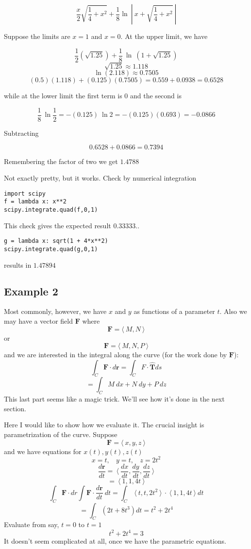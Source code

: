 \documentclass[11pt, oneside]{report}   	%
\begin{document}
\[ \frac{x}{2}\sqrt{\frac{1}{4} + x^2} + \frac{1}{8} \ln \ | \ x + \sqrt{\frac{1}{4} + x^2} \ | \]

Suppose the limits are $x=1$ and $x=0$.  At the upper limit, we have

\[ \frac{1}{2}(\sqrt{1.25}) + \frac{1}{8} \ \ln \ (1 + \sqrt{1.25}) \] 
\[ \sqrt{1.25} \approx 1.118  \]
\[ \ln (2.118) \approx 0.7505 \]
\[ (0.5)(1.118) + (0.125)(0.7505) = 0.559 + 0.0938 = 0.6528 \]

while at the lower limit the first term is $0$ and the second is

\[ \frac{1}{8}\  \ln \frac{1}{2} = - (0.125)\  \ln 2 = - (0.125)(0.693) = -0.0866 \] 

Subtracting

\[ 0.6528 + 0.0866 = 0.7394 \]

Remembering the factor of two we get $1.4788$

Not exactly pretty, but it works.  Check by numerical integration

\begin{verbatim}
import scipy
f = lambda x: x**2
scipy.integrate.quad(f,0,1)
\end{verbatim}
This check gives the expected result $ 0.33333..$

\begin{verbatim}
g = lambda x: sqrt(1 + 4*x**2)
scipy.integrate.quad(g,0,1)
\end{verbatim}
results in $1.47894$

\subsection*{Example 2}
Most commonly, however, we have $x$ and $y$ as functions of a parameter $t$.  Also we may have a vector field $\mathbf{F}$ where
\[ \mathbf{F} = \langle \ M,N \ \rangle \]
or
\[ \mathbf{F} = \langle \ M,N,P \ \rangle \]
and we are interested in the integral along the curve (for the work done by $\mathbf{F}$):
\[ \int_C \mathbf{F} \cdot d\mathbf{r} = \int_C F \cdot \hat{\mathbf{T}} ds \]
\[ = \int_C M \ dx + N \ dy + P \ dz \]
This last part seems like a magic trick.  We'll see how it's done in the next section.

Here I would like to show how we evaluate it.  The crucial insight is parametrization of the curve.  Suppose
\[ \mathbf{F} = \langle \ x,y,z \ \rangle \]
and we have equations for $x(t), y(t), z(t)$
\[ x = t, \ \ \ \ y = t, \ \ \ \ z = 2t^2 \]
\[\frac{d\mathbf{r}}{dt} = \ \langle \ \frac{dx}{dt},\frac{dy}{dt},\frac{dz}{dt} \ \rangle \]
\[ = \ \langle \ 1,1,4t \ \rangle \]\[ \int_C \mathbf{F} \cdot dr \int \mathbf{F} \cdot \frac{d\mathbf{r}}{dt} \ dt = \int_C \ \langle \ t,t,2t^2 \ \rangle \  \cdot \ \langle \ 1,1,4t \ \rangle \ dt \]
\[ = \int_C (2t + 8t^3) dt = t^2 + 2t^4 \]
Evaluate from say, $t=0$ to $t=1$
\[  t^2 + 2t^4 = 3 \]
It doesn't seem complicated at all, once we have the parametric equations.
\vspace{2 mm}
\end{document}
